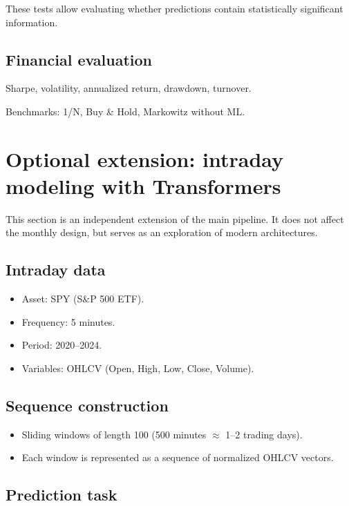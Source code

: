 \documentclass[12pt]{article}
\begin{document}
These tests allow evaluating whether predictions contain statistically significant information.

\subsection{Financial evaluation}

Sharpe, volatility, annualized return, drawdown, turnover.

Benchmarks: 1/N, Buy \& Hold, Markowitz without ML.


\section{Optional extension: intraday modeling with Transformers}

This section is an independent extension of the main pipeline. It does not affect the monthly design, but serves as an exploration of modern architectures.

\subsection{Intraday data}

\begin{itemize}
    \item Asset: SPY (S\&P 500 ETF).
    \item Frequency: 5 minutes.
    \item Period: 2020--2024.
    \item Variables: OHLCV (Open, High, Low, Close, Volume).
\end{itemize}

\subsection{Sequence construction}

\begin{itemize}
    \item Sliding windows of length 100 (500 minutes $\approx$ 1--2 trading days).
    \item Each window is represented as a sequence of normalized OHLCV vectors.
\end{itemize}

\subsection{Prediction task}
\end{document}
